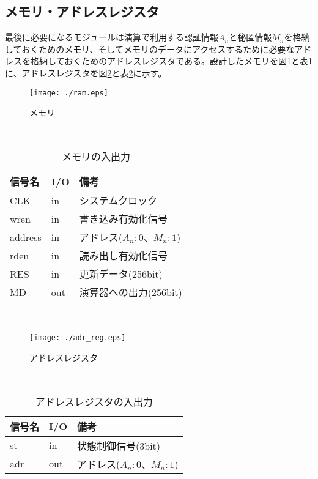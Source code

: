 \documentclass{thesis}
\begin{document}
\subsection{メモリ・アドレスレジスタ}
最後に必要になるモジュールは演算で利用する認証情報$A_n$と秘匿情報$M_n$を格納しておくためのメモリ、そしてメモリのデータにアクセスするために必要なアドレスを格納しておくためのアドレスレジスタである。設計したメモリを図\ref{RAM}と表\ref{RAMIO}に、アドレスレジスタを図\ref{アドレスレジスタ}と表\ref{アドレスレジスタIO}に示す。
\begin{figure}[H]
 \center
 \texttt{[image: ./ram.eps]}
 \caption{メモリ}
 \label{RAM}
\end{figure}

\begin{table}[htb]
　\begin{center}
\caption{メモリの入出力}
\label{RAMIO}
  \begin{tabular}{|p{2cm}|p{1cm}|p{5cm}|} \hline
  信号名 & I/O & 備考 \\ \hline \hline
   CLK   &  in   & システムクロック  \\ \hline
   wren  &  in   &  書き込み有効化信号  \\ \hline
   address   &  in   & アドレス($A_n : 0$、$M_n : 1$)  \\ \hline
   rden  &  in    &  読み出し有効化信号  \\ \hline
   RES   &  in  &  更新データ(256bit)  \\ \hline
   MD   &  out  &  演算器への出力(256bit)  \\ \hline
  \end{tabular}
  \end{center}
\end{table}　\\

\newpage

\begin{figure}[H]
 \center
 \texttt{[image: ./adr\_reg.eps]}
 \caption{アドレスレジスタ}
 \label{アドレスレジスタ}
\end{figure}

\begin{table}[htb]
　\begin{center}
\caption{アドレスレジスタの入出力}
\label{アドレスレジスタIO}
  \begin{tabular}{|p{2cm}|p{1cm}|p{5cm}|} \hline
  信号名 & I/O & 備考 \\ \hline \hline
   st  &  in    &  状態制御信号(3bit)  \\ \hline
   adr   &  out  &  アドレス($A_n : 0$、$M_n : 1$)  \\ \hline
  \end{tabular}
  \end{center}
\end{table}　\\
\end{document}
